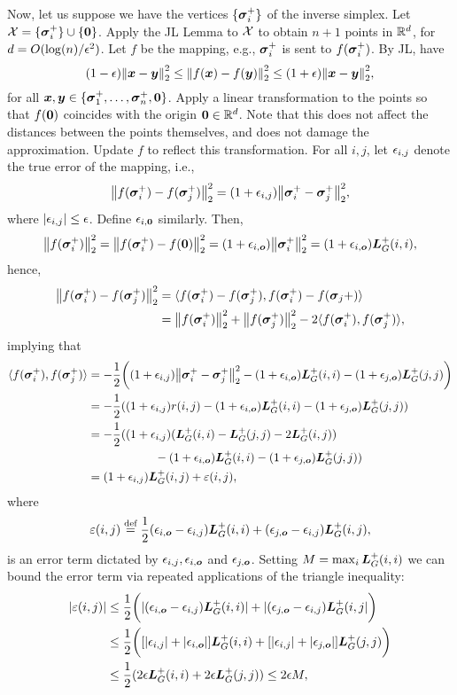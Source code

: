 Now, let us suppose we have the vertices $\{\vb*{\sigma}_i^+\}$ of the inverse simplex. Let $\mathcal{X} = \{\vb*{\sigma}_i^+\}\cup\{\vb{0}\}$. Apply the JL Lemma to $\mathcal{X}$ to  obtain $n+1$ points in $\mathbb{R}^d$, for $d=O(\log(n)/\epsilon^2)$. Let $f$ be the mapping, e.g., $\vb*{\sigma}_i^+$ is sent to $f(\vb*{\sigma}_i^+)$. By JL, have 
\[(1-\epsilon)\norm{\vb*{x}-\vb*{y}}_2^2\leq  \norm{f(\vb*{x}) -f(\vb*{y})}_2^2\leq (1+\epsilon)\norm{\vb*{x}-\vb*{y}}_2^2, \]
for all $\vb*{x},\vb*{y}\in \{\vb*{\sigma}_1^+,\dots,\vb*{\sigma}_n^+,\vb{0}\}$. 
Apply a linear transformation to the points so that $f(\vb{0})$ coincides with the origin $\vb{0}\in\mathbb{R}^d$. Note that this does not affect the distances between the points themselves, and does not damage the approximation. Update $f$ to reflect this transformation. 
For all $i,j$, let $\epsilon_{i,j}$ denote the true error of the mapping, i.e., 
\[\norm{f(\vb*{\sigma}_i^+)-f(\vb*{\sigma}_j^+)}_2^2 = (1+\epsilon_{i,j})\norm{\vb*{\sigma}_i^+-\vb*{\sigma}_j^+}_2^2,\]
where $|\epsilon_{i,j}|\leq \epsilon$. Define $\epsilon_{i,\vb{0}}$ similarly. 
Then, 
\[\norm{f(\vb*{\sigma}_i^+)}_2^2 = \norm{f(\vb*{\sigma}_i^+)-f(\vb{0})}_2^2 = (1+\epsilon_{i,\vb*{o}})\norm{\vb*{\sigma}_i^+}_2^2 = (1+\epsilon_{i,\vb*{o}})\vb*{L}_G^+(i,i),\]
hence, 
\begin{align*}
\norm{f(\vb*{\sigma}_i^+)-f(\vb*{\sigma}_j^+)}_2^2 &= \langle f(\vb*{\sigma}_i^+)-f(\vb*{\sigma}_j^+),f(\vb*{\sigma}_i^+)-f(\vb*{\sigma}_j+)\rangle \\
&= \norm{f(\vb*{\sigma}_i^+)}_2^2 + \norm{f(\vb*{\sigma}_j^+)}_2^2 - 2\langle f(\vb*{\sigma}_i^+),f(\vb*{\sigma}_j^+)\rangle,  
\end{align*}
implying that 
\begin{align*}
\langle f(\vb*{\sigma}_i^+),f(\vb*{\sigma}_j^+) \rangle &= -\frac{1}{2} \bigg((1+\epsilon_{i,j})\norm{\vb*{\sigma}_i^+-\vb*{\sigma}_j^+}_2^2 - (1+\epsilon_{i,\vb*{o}})\vb*{L}_G^+(i,i) - (1+\epsilon_{j,\vb*{o}})\vb*{L}_G^+(j,j)\bigg) \\
&= -\frac{1}{2}((1+\epsilon_{i,j})r(i,j) - (1+\epsilon_{i,\vb*{o}})\vb*{L}_G^+(i,i) - (1+\epsilon_{j,\vb*{o}})\vb*{L}_G^+(j,j)) \\
&= -\frac{1}{2}((1+\epsilon_{i,j})(\vb*{L}_G^+(i,i) - \vb*{L}_G^+(j,j) - 2\vb*{L}_G^+(i,j)) \\
&\hspace{2cm}- (1+\epsilon_{i,\vb*{o}})\vb*{L}_G^+(i,i) - (1+\epsilon_{j,\vb*{o}})\vb*{L}_G^+(j,j))\\
&= (1+\epsilon_{i,j})\vb*{L}_G^+(i,j) + \varepsilon(i,j),
\end{align*}
where 
\[\varepsilon(i,j)\overset{\text{def}}{=} \frac{1}{2}(\epsilon_{i,\vb*{o}}-\epsilon_{i,j})\vb*{L}_G^+(i,i) + (\epsilon_{j,\vb*{o}}-\epsilon_{i,j})\vb*{L}_G^+(i,j),\]
is an error term dictated by $\epsilon_{i,j}, \epsilon_{i,\vb*{o}}$ and $\epsilon_{j,\vb*{o}}$. Setting $M= \max_i \vb*{L}_G^+(i,i)$ 
we can bound the error term via repeated applications of the triangle inequality: 
\begin{align*}
|\varepsilon(i,j)|& \leq \frac{1}{2}\bigg(|(\epsilon_{i,\vb*{o}}-\epsilon_{i,j})\vb*{L}_G^+(i,i)| + |(\epsilon_{j,\vb*{o}}-\epsilon_{i,j})\vb*{L}_G^+(i,j|\bigg) \\
& \leq \frac{1}{2}\bigg([|\epsilon_{i,j}|+|\epsilon_{i,\vb*{o}}|]\vb*{L}_G^+(i,i) + [|\epsilon_{i,j}|+|\epsilon_{j,\vb*{o}}|]\vb*{L}_G^+(j,j)\bigg) \\
&\leq \frac{1}{2} ( 2\epsilon\vb*{L}_G^+(i,i) + 2\epsilon\vb*{L}_G^+(j,j) ) \leq 2\epsilon M,
\end{align*}
